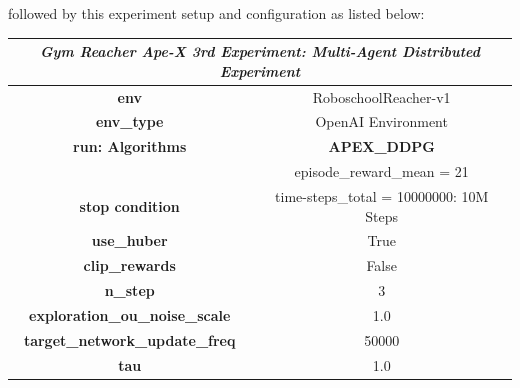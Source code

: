 followed by this experiment setup and configuration as listed below:
\begin{table}[!htb]
		\centering
		\begin{tabular}{|c|l|l|c|l|l|}
				\hline
				\multicolumn{6}{|c|}{\textit{\textbf{Gym Reacher Ape-X 3rd Experiment: Multi-Agent Distributed Experiment}}}                                                        \\ \hline
				\multicolumn{3}{|c|}{\textbf{env}}                                  & \multicolumn{3}{c|}{RoboschoolReacher-v1}                                           \\ \hline
				\multicolumn{3}{|c|}{\textbf{env\_type}}                            & \multicolumn{3}{c|}{OpenAI Environment}                                             \\ \hline
				\multicolumn{3}{|c|}{\textbf{run: Algorithms}}                      & \multicolumn{3}{c|}{\cellcolor[HTML]{C0C0C0}\textbf{APEX\_DDPG}}                           \\ \hline
				\multicolumn{3}{|c|}{}                                              & \multicolumn{3}{c|}{\cellcolor[HTML]{E1F7E1}episode\_reward\_mean = 21}             \\ \cline{4-6} 
				\multicolumn{3}{|c|}{\multirow{-2}{*}{\textbf{stop condition}}}     & \multicolumn{3}{c|}{\cellcolor[HTML]{E1F7E1}time-steps\_total = 10000000: 10M Steps} \\ \hline
				\multicolumn{3}{|c|}{\textbf{use\_huber}}                                & \multicolumn{3}{c|}{True}                                                           \\ \hline
				\multicolumn{3}{|c|}{\textbf{clip\_rewards}}                            & \multicolumn{3}{c|}{False}                                                            \\ \hline
				\multicolumn{3}{|c|}{\textbf{n\_step}}                       & \multicolumn{3}{c|}{3}                                                             \\ \hline
				\multicolumn{3}{|c|}{\textbf{exploration\_ou\_noise\_scale}}                                   & \multicolumn{3}{c|}{1.0}                                                         \\ \hline
				\multicolumn{3}{|c|}{\textbf{target\_network\_update\_freq}}                 & \multicolumn{3}{c|}{50000}                                                           \\ \hline
				\multicolumn{3}{|c|}{\textbf{tau}}                   & \multicolumn{3}{c|}{1.0}                                                          \\ \hline

\end{tabular}
\end{table}
